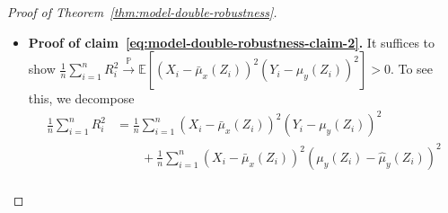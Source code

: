 \documentclass[12pt]{article}
\theoremstyle{definition}
\def\P{\mathbb{P}}
\def\P{\mathbb{P}}
\newcommand{\E}{\mathbb E}								%
\renewcommand{\P}{\mathbb{P}}							%
\newcommand{\convp}{\overset{\mathbb{P}}{\rightarrow}}             %
\newcommand{\srx}{X}									%
\newcommand{\srz}{Z}									%
\newcommand{\sry}{Y}									%
\begin{document}
\begin{proof}[Proof of Theorem~\ref{thm:model-double-robustness}]
\begin{itemize}
\begin{align*}
			&
			\equiv\frac{1}{\sqrt{n}}\sum_{i=1}^n (\srx_i-\bar \mu_x(\srz_i))(\sry_i-\mu_y(\srz_i))+\mathrm{Bias}_1+\mathrm{Bias}_2+\mathrm{Bias}_3.
		\end{align*}
		Now we show that $\mathrm{Bias}_1,\mathrm{Bias}_2,\mathrm{Bias}_3$ are all $o_\P(1)$. We first show $\mathrm{Bias}_1=o_\P(1)$. To see this, we first use conditoin~\eqref{eq:bounded-mu} to bound
		\begin{align*}
			\E[\mathrm{Bias}_1^2|\sry,\srz]
			&
			=\frac{1}{n}\sum_{i=1}^n (\bar\mu_x(\srz_i)-\widehat{\mu}_x(\srz_i))^2\mathrm{E}[(\sry_i-\mu_y(\srz_i))^2|\srz_i]\\
			&
			\leq C_u\frac{1}{n}\sum_{i=1}^n (\bar\mu_x(\srz_i)-\widehat{\mu}_x(\srz_i))^2.
		\end{align*}
		Then by conditonal Markov's inequality (Lemma~\ref{lem:conditional_Markov}), we have for any $\varepsilon>0$ such that
		\begin{align*}
		    \P[\mathrm{Bias}_1^2>\varepsilon]=\P[\mathrm{Bias}_1^2\wedge \varepsilon>\varepsilon]\leq \varepsilon^{-1}\E[\E[\mathrm{Bias}_1^2|\sry,\srz]\wedge\varepsilon].
	    \end{align*}
		Then by condition~\eqref{eq:consistency-mu-x} and dominated convergence theorem, we have $\P[\mathrm{Bias}_1^2>\varepsilon]\rightarrow0$. Thus we have shown that $\mathrm{Bias}_1=o_\P(1)$. Similarly, we can show $\mathrm{Bias}_2=o_\P(1)$ using condition~\eqref{eq:consistency-mu-y}. Now we show $\mathrm{Bias}_3=o_\P(1)$. To see this, we use Cauchy-Schwarz inequality to compute
		\begin{align*}
			\mathrm{Bias}_3\leq \sqrt{n}\sqrt{\frac{1}{n}\sum_{i=1}^n (\bar \mu_x(\srz_i)-\widehat{\mu}_x(\srz_i))^2}\cdot \sqrt{\frac{1}{n}\sum_{i=1}^n (\mu_y(\srz_i)-\widehat\mu_y(\srz_i))^2}.
		\end{align*}
		By Assumption~\eqref{eq:MSE-rate}, we have $\mathrm{Bias}_3=o_\P(1)$. Thus we have shown that $\mathrm{Bias}_1,\mathrm{Bias}_2,\mathrm{Bias}_3=o_\P(1)$ and hence \eqref{eq:model-double-robustness-claim-1} holds.
		\item \textbf{Proof of claim~\eqref{eq:model-double-robustness-claim-2}.} It suffices to show $\frac{1}{n}\sum_{i=1}^n R_i^2\convp \E[(\srx_i-\bar\mu_x(\srz_i))^2(\sry_i-\mu_y(\srz_i))^2]>0$. To see this, we decompose
		\begin{align*}
			\frac{1}{n}\sum_{i=1}^n R_i^2
			&
			=\frac{1}{n}\sum_{i=1}^n (\srx_i-\bar\mu_x(\srz_i))^2(\sry_i-\mu_y(\srz_i))^2\\
			&
			\qquad +\frac{1}{n}\sum_{i=1}^n (\srx_i-\bar\mu_x(\srz_i))^2(\mu_y(\srz_i)-\widehat{\mu}_y(\srz_i))^2\\

\end{align*}
\end{itemize}
\end{proof}
\end{document}

